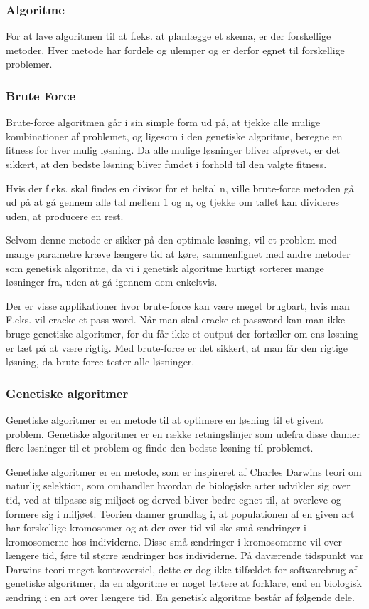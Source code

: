 \subsubsection{Algoritme}

For at lave algoritmen til at f.eks. at planlægge et skema, er der forskellige metoder. Hver metode har fordele og ulemper og er derfor egnet til forskellige problemer.

\subsubsection{Brute Force}

Brute-force algoritmen går i sin simple form ud på, at tjekke alle mulige kombinationer af problemet, og ligesom i den genetiske algoritme, beregne en fitness for hver mulig løsning. Da alle mulige løsninger bliver afprøvet, er det sikkert, at den bedste løsning bliver fundet i forhold til den valgte fitness. 

Hvis der f.eks. skal findes en divisor for et heltal n, ville brute-force metoden gå ud på at gå gennem alle tal mellem 1 og n, og tjekke om tallet kan divideres uden, at producere en rest.

Selvom denne metode er sikker på den optimale løsning, vil et problem med mange parametre kræve længere tid at køre, sammenlignet med andre metoder som genetisk algoritme, da vi i genetisk algoritme hurtigt sorterer mange løsninger fra, uden at gå igennem dem enkeltvis.

Der er visse applikationer hvor brute-force kan være meget brugbart, hvis man F.eks. vil cracke et pass-word. Når man skal cracke et password kan man ikke bruge genetiske algoritmer, for du får ikke et output der fortæller om ens løsning er tæt på at være rigtig. Med brute-force er det sikkert, at man får den rigtige løsning, da brute-force tester alle løsninger.

\subsubsection{Genetiske algoritmer}
Genetiske algoritmer er en metode til at optimere en løsning til et givent problem. Genetiske algoritmer er en række retningslinjer som udefra disse danner flere løsninger til et problem og finde den bedste løsning til problemet.

Genetiske algoritmer er en metode, som er inspireret af Charles Darwins teori om naturlig selektion, som omhandler hvordan de biologiske arter udvikler sig over tid, ved at tilpasse sig miljøet og derved bliver bedre egnet til, at overleve og formere sig i miljøet. Teorien danner grundlag i, at populationen af en given art har forskellige kromosomer og at der over tid vil ske små ændringer i kromosomerne hos individerne. Disse små ændringer i kromosomerne vil over længere tid, føre til større ændringer hos individerne. På daværende tidspunkt var Darwins teori meget kontroversiel, dette er dog ikke tilfældet for softwarebrug af genetiske algoritmer, da en algoritme er noget lettere at forklare, end en biologisk ændring i en art over længere tid.
En genetisk algoritme består af følgende dele.

